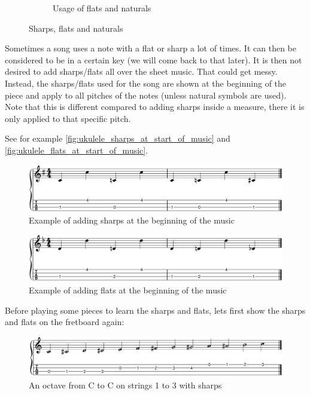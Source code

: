 \begin{figure}[h]
\begin{subfigure}[b]{0.45\textwidth}
		\caption{Usage of flats and naturals}
		\label{fig:ukulele_usage_of_flats_and_naturals}
	\end{subfigure}
	\caption{Sharps, flats and naturals}
\end{figure}

Sometimes a song uses a note with a flat or sharp a lot of times. It can then be considered to be in a certain key (we will come back to that later). It is then not desired to add sharps/flats all over the sheet music. That could get messy. Instead, the sharps/flats used for the song are shown at the beginning of the piece and apply to all pitches of the notes (unless natural symbols are used). Note that this is different compared to adding sharps inside a measure, there it is only applied to that specific pitch.

See for example \autoref{fig:ukulele_sharps_at_start_of_music} and \autoref{fig:ukulele_flats_at_start_of_music}.

\begin{figure}[h]
	\centering
	\includegraphics[width=\textwidth]{../../MuseScore/Ukulele/UkuleleKeySharpExample.png}
	\caption{Example of adding sharps at the beginning of the music}
	\label{fig:ukulele_sharps_at_start_of_music}
\end{figure}

\begin{figure}[h]
	\centering
	\includegraphics[width=\textwidth]{../../MuseScore/Ukulele/UkuleleKeyFlatExample.png}
	\caption{Example of adding flats at the beginning of the music}
	\label{fig:ukulele_flats_at_start_of_music}
\end{figure}

\newpage

Before playing some pieces to learn the sharps and flats, lets first show the sharps and flats on the fretboard again:

\begin{figure}[h]
	\centering
	\includegraphics[width=\textwidth]{../../MuseScore/Ukulele/UkuleleChromaticNotesSharpsMultiString.png}
	\caption{An octave from C to C on strings 1 to 3 with sharps}
	\label{fig:ukulele_multi_string_octave_sharps_chapter_music_notation}
\end{figure}

